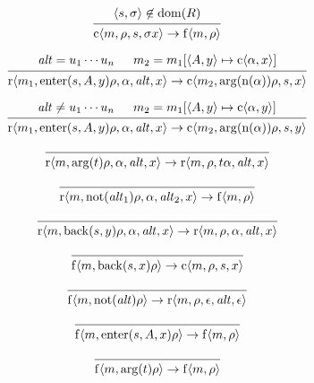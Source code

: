 \documentclass[12pt]{article}
\begin{document}
\[
  \begin{prooftree}
    \hypo{\langle s, \sigma\rangle \not\in \mathrm{dom}(R)}
    \infer1{\mathrm{c}\langle m, \rho, s, \sigma x\rangle \to \mathrm{f}\langle m, \rho\rangle}
  \end{prooftree}
\]

\[
  \begin{prooftree}
    \hypo{\mathit{alt} = u_1 \cdots u_n}
    \hypo{m_2 = m_1[\langle A, y\rangle \mapsto \mathrm{c}\langle \alpha, x\rangle]}
    \infer2{\mathrm{r}\langle m_1, \mathrm{enter}(s, A, y) \rho, \alpha, \mathit{alt}, x\rangle \to \mathrm{c}\langle m_2, \mathrm{arg}(\mathrm{n}(\alpha)) \rho, s, x\rangle}
  \end{prooftree}
\]

\[
  \begin{prooftree}
    \hypo{\mathit{alt} \neq u_1 \cdots u_n}
    \hypo{m_2 = m_1[\langle A, y\rangle \mapsto \mathrm{c}\langle \alpha, y\rangle]}
    \infer2{\mathrm{r}\langle m_1, \mathrm{enter}(s, A, y) \rho, \alpha, \mathit{alt}, x\rangle \to \mathrm{c}\langle m_2, \mathrm{arg}(\mathrm{n}(\alpha)) \rho, s, y\rangle}
  \end{prooftree}
\]

\[
  \begin{prooftree}
    \infer0{\mathrm{r}\langle m, \mathrm{arg}(t) \rho, \alpha, \mathit{alt}, x\rangle \to \mathrm{r}\langle m, \rho, t \alpha, \mathit{alt}, x\rangle}
  \end{prooftree}
\]

\[
  \begin{prooftree}
    \infer0{\mathrm{r}\langle m, \mathrm{not}(\mathit{alt}_1) \rho, \alpha, \mathit{alt}_2, x\rangle \to \mathrm{f}\langle m, \rho\rangle}
  \end{prooftree}
\]

\[
  \begin{prooftree}
    \infer0{\mathrm{r}\langle m, \mathrm{back}(s, y) \rho, \alpha, \mathit{alt}, x\rangle \to \mathrm{r}\langle m, \rho, \alpha, \mathit{alt}, x\rangle}
  \end{prooftree}
\]

\[
  \begin{prooftree}
    \infer0{\mathrm{f}\langle m, \mathrm{back}(s, x) \rho\rangle \to \mathrm{c}\langle m, \rho, s, x\rangle}
  \end{prooftree}
\]

\[
  \begin{prooftree}
    \infer0{\mathrm{f}\langle m, \mathrm{not}(\mathit{alt}) \rho\rangle \to \mathrm{r}\langle m, \rho, \epsilon, \mathit{alt}, \epsilon\rangle}
  \end{prooftree}
\]

\[
  \begin{prooftree}
    \infer0{\mathrm{f}\langle m, \mathrm{enter}(s, A, x) \rho\rangle \to \mathrm{f}\langle m, \rho\rangle}
  \end{prooftree}
\]

\[
  \begin{prooftree}
    \infer0{\mathrm{f}\langle m, \mathrm{arg}(t) \rho\rangle \to \mathrm{f}\langle m, \rho\rangle}
  \end{prooftree}
\]
\end{document}
